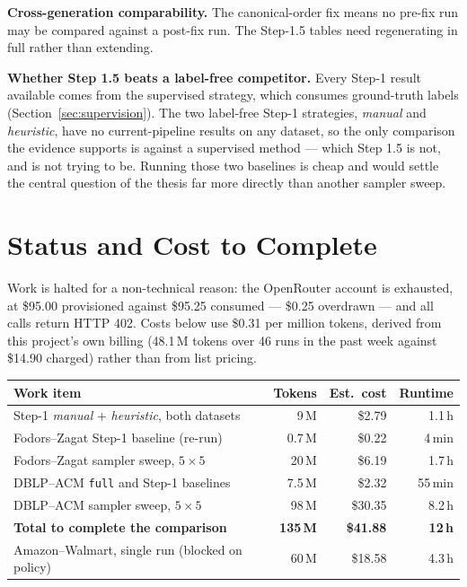 \documentclass[11pt]{article}
\begin{document}
\textbf{Cross-generation comparability.} The canonical-order fix means no pre-fix run
may be compared against a post-fix run. The Step-1.5 tables need regenerating in full
rather than extending.

\textbf{Whether Step 1.5 beats a label-free competitor.} Every Step-1 result available
comes from the supervised strategy, which consumes ground-truth labels
(Section~\ref{sec:supervision}). The two label-free Step-1 strategies, \emph{manual}
and \emph{heuristic}, have no current-pipeline results on any dataset, so the only
comparison the evidence supports is against a supervised method --- which Step 1.5 is
not, and is not trying to be. Running those two baselines is cheap and would settle
the central question of the thesis far more directly than another sampler sweep.

\section{Status and Cost to Complete}

Work is halted for a non-technical reason: the OpenRouter account is exhausted, at
\$95.00 provisioned against \$95.25 consumed --- \$0.25 overdrawn --- and all calls
return HTTP 402. Costs below use \$0.31 per million tokens, derived from this
project's own billing (48.1\,M tokens over 46 runs in the past week against \$14.90
charged) rather than from list pricing.

\begin{center}
\small
\begin{tabular}{lrrr}
\toprule
Work item & Tokens & Est.\ cost & Runtime \\
\midrule
Step-1 \emph{manual} + \emph{heuristic}, both datasets & 9\,M & \$2.79 & 1.1\,h \\
Fodors--Zagat Step-1 baseline (re-run) & 0.7\,M & \$0.22 & 4\,min \\
Fodors--Zagat sampler sweep, $5\times5$ & 20\,M & \$6.19 & 1.7\,h \\
DBLP--ACM \texttt{full} and Step-1 baselines & 7.5\,M & \$2.32 & 55\,min \\
DBLP--ACM sampler sweep, $5\times5$ & 98\,M & \$30.35 & 8.2\,h \\
\midrule
\textbf{Total to complete the comparison} & \textbf{135\,M} & \textbf{\$41.88} & \textbf{12\,h} \\
\midrule
Amazon--Walmart, single run (blocked on policy) & 60\,M & \$18.58 & 4.3\,h \\
\bottomrule
\end{tabular}
\end{center}
\end{document}
